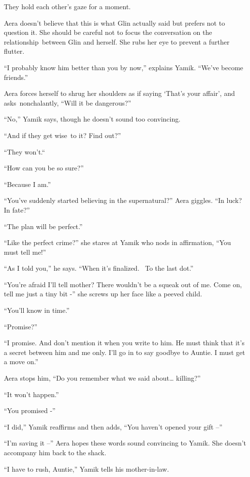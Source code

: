 \documentclass[twoside,11pt]{book}
\begin{document}
They hold each other's gaze for a moment.

Aera doesn't believe that this is what Glin actually said but prefers not to question it. She should be careful not to
focus the conversation on the relationship~between Glin and herself. She rubs her eye to prevent a further flutter.

``I probably know him better than you by now,'' explains Yamik. ``We've become
friends.'' 

Aera forces herself to shrug her shoulders as if saying `That's your affair', and asks~nonchalantly, ``Will
it be dangerous?'' 

``No,'' Yamik says, though he doesn't sound too convincing. 

``And if they get wise{\ }to it? Find out?'' 

``They won't.``\ \ 

``How can you be so sure?'' 

``Because I am.'' 

``You've suddenly started believing in the supernatural?'' Aera giggles. ``In
luck? In fate?'' 

``The plan will be perfect.'' 

``Like the perfect crime?'' she stares at Yamik who nods in affirmation, ``You must tell me!''


``As I told you,'' he says. ``When it's finalized.~ To the last dot.'' 

``You're afraid I'll tell mother? There wouldn't be a squeak out of me. Come on, tell me just a tiny bit
-'' she screws up her face like a peeved child. 

``You'll know in time.'' 

``Promise?'' 

``I promise. And don't mention it when you write to him. He must think that it's a secret between him and
me only. I'll go in to say goodbye to Auntie. I must get a move on.'' 

Aera stops him, ``Do you remember what we said about{\dots} killing?'' 

``It won't happen.'' 

``You promised -'' 

``I did,'' Yamik reaffirms and then adds, ``You haven't opened your gift
--''

``I'm saving it --'' Aera hopes these words sound convincing to Yamik. She doesn't accompany
him back to the shack.

``I have to rush, Auntie,'' Yamik tells his mother-in-law. 
\end{document}
